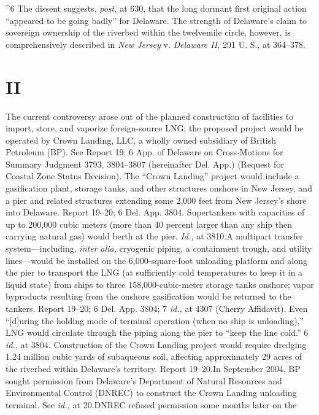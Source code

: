 {^6 The dissent suggests, \emph{post,} at 630, that the long dormant
first original action ``appeared to be going badly'' for Delaware. The
strength of Delaware's claim to sovereign ownership of the riverbed
within the twelvemile circle, however, is comprehensively described in
\emph{New Jersey} v. \emph{Delaware II,} 291 U. S., at 364--378.

\section{II}

  The current controversy arose out of the planned construction of
facilities to import, store, and vaporize foreign-source LNG; the
proposed project would be operated by Crown Landing, LLC, a wholly
owned subsidiary of British Petroleum (BP). See Report 19; 6 App.
of Delaware on Cross-Motions for Summary Judgment 3793, 3804--3807
(hereinafter Del. App.) (Request for Coastal Zone Status Decision).
The ``Crown Landing'' project would include a gasification plant,
storage tanks, and other structures onshore in New Jersey, and a
pier and related structures extending some 2,000 feet from New
Jersey's shore into Delaware. Report 19--20; 6 Del. App. 3804.
Supertankers with capacities of up to 200,000 cubic meters (more than
40 percent larger than any ship then carrying natural gas) would
berth at the pier. \emph{Id.,} at 3810.\footnotemark[7] A multipart transfer
system---including, \emph{inter alia,} cryogenic piping, a containment
trough, and utility lines---would be installed on the 6,000-square-foot
unloading platform and along the pier to transport the LNG (at
sufficiently cold temperatures to keep it in a liquid state) from
ships to three 158,000-cubic-meter storage tanks onshore; vapor
byproducts resulting from the onshore gasification would be returned
to the tankers. Report 19--20; 6 Del. App. 3804; 7 \emph{id.,} at 4307
(Cherry Affidavit). Even ``[d]uring the holding mode of terminal
operation (when no ship is unloading),'' LNG would circulate through
the piping along the pier to ``keep the line cold.'' 6 \emph{id.,}
at 3804. Construction of \newpage  the Crown Landing project would
require dredging 1.24 million cubic yards of subaqueous soil, affecting
approximately 29 acres of the riverbed within Delaware's territory.
Report 19--20.\footnotemark[8] In September 2004, BP sought permission from
Delaware's Department of Natural Resources and Environmental Control
(DNREC) to construct the Crown Landing unloading terminal. See
\emph{id.,} at 20.\footnotemark[9] DNREC refused permission some months later on the
}
